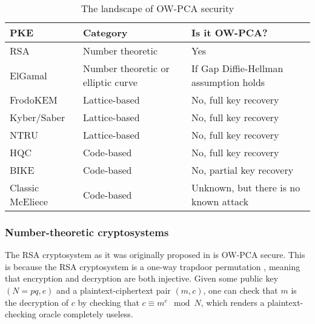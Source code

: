 \documentclass[runningheads]{llncs}
\begin{document}
\begin{table}
    \centering
    \begin{tabular}{|p{9em}|p{10em}|p{14em}|}
        \hline
        \centering\textbf{PKE} & \textbf{Category} & \textbf{Is it OW-PCA?} \\
        \hline
        RSA & Number theoretic & Yes \cite{DBLP:conf/ima/Dent03,DBLP:journals/iacr/Shoup01} \\
        \hline
        ElGamal & {Number theoretic or \newline elliptic curve} & If Gap Diffie-Hellman assumption holds \cite{DBLP:conf/ctrsa/AbdallaBR01,DBLP:conf/pkc/OkamotoP01} \\
        \hline\hline
        FrodoKEM & Lattice-based & No, full key recovery \cite{DBLP:conf/crypto/GuoJN20,DBLP:conf/eurocrypt/BaetuDHTV19} \\
        \hline
        Kyber/Saber & Lattice-based & No, full key recovery \cite{DBLP:conf/acns/Huguenin-Dumittan20,DBLP:conf/asiacrypt/XagawaIUTH21,DBLP:conf/pqcrypto/GuoM23} \\
        \hline
        NTRU & Lattice-based & No, full key recovery \cite{hoffstein1999reaction,DBLP:conf/crypto/JaulmesJ00,DBLP:journals/tches/UenoXTITH22} \\
        \hline\hline
        HQC & Code-based & No, full key recovery \cite{DBLP:conf/acns/Huguenin-Dumittan20,DBLP:conf/eurocrypt/BaetuDHTV19} \\
        \hline
        BIKE & Code-based & No, partial key recovery \cite{DBLP:conf/asiacrypt/Guo0S16} \\
        \hline
        Classic McEliece & Code-based & Unknown, but there is no known attack \cite{DBLP:journals/tches/UenoXTITH22} \\
        \hline
    \end{tabular}
    \caption{The landscape of OW-PCA security}\label{tbl:ow-pca-candidates}
\end{table}



\subsubsection{Number-theoretic cryptosystems} The RSA cryptosystem as it was originally proposed in \cite{DBLP:journals/cacm/RivestSA78} is OW-PCA secure. This is because the RSA cryptosystem is a one-way trapdoor permutation \cite{DBLP:conf/crypto/FujisakiOPS01}, meaning that encryption and decryption are both injective. Given some public key $(N=pq, e)$ and a plaintext-ciphertext pair $(m, c)$, one can check that $m$ is the decryption of $c$ by checking that $c \equiv m^e \mod N$, which renders a plaintext-checking oracle completely useless.
\end{document}
